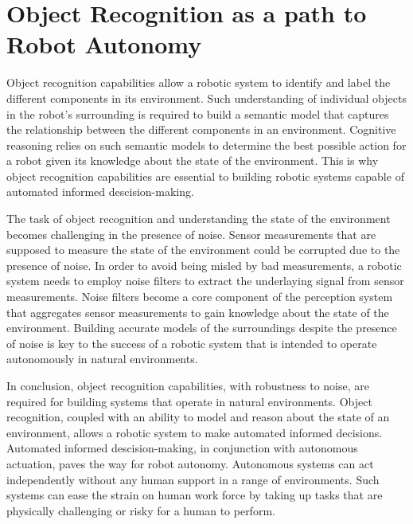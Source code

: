 \documentclass {udthesis}
\begin{document}
\section{Object Recognition as a path to Robot Autonomy}

Object recognition capabilities allow a robotic system to identify and label the different components in its environment. Such understanding of individual objects in the robot's surrounding is required to build a semantic model that captures the relationship between the different components in an environment.
Cognitive reasoning relies on such semantic models to determine the best possible action for a robot given its knowledge about the state of the environment. This is why object recognition capabilities are essential to building robotic systems capable of automated informed descision-making.

The task of object recognition and understanding the state of the environment becomes challenging in the presence of noise. Sensor measurements
that are supposed to measure the state of the environment could be corrupted due to the presence of noise. In order to avoid being misled by bad measurements,
a robotic system needs to employ noise filters to extract the underlaying signal from sensor measurements. Noise filters become a core component of the perception system that aggregates sensor measurements to gain knowledge about the state of the environment. Building accurate models of the surroundings despite the presence of noise is key to the success of a robotic system that is intended to operate autonomously in natural environments.

In conclusion, object recognition capabilities, with robustness to noise, are required for building systems that operate in natural environments. Object recognition, coupled with an ability to model and reason about the state of an environment, allows a robotic system to make automated informed decisions. Automated informed descision-making, in conjunction with autonomous actuation, paves the way for robot autonomy. Autonomous systems can act independently without any human support in a range of environments. Such systems can ease the strain on human work force by taking up tasks that are physically challenging or risky for a human to perform.

\end{document}
